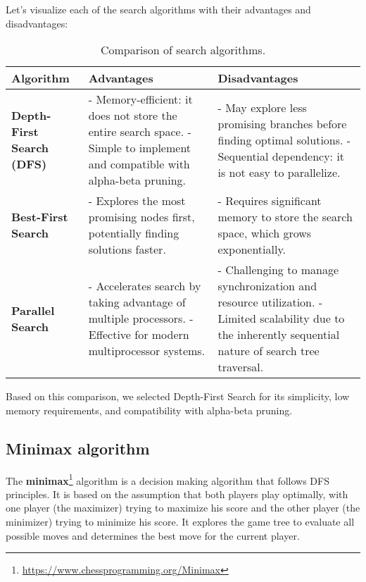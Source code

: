 \vspace{1em}

Let's visualize each of the search algorithms with their advantages and disadvantages:

\begin{table}[H]
\centering
\begin{tabular}{|p{3.5cm}|p{4.5cm}|p{4.5cm}|}
\hline
\textbf{Algorithm} & \textbf{Advantages} & \textbf{Disadvantages} \\ \hline
\textbf{Depth-First Search (DFS)} 
& 
- Memory-efficient: it does not store the entire search space. \newline 
- Simple to implement and compatible with alpha-beta pruning. 
& 
- May explore less promising branches before finding optimal solutions.
\newline
- Sequential dependency: it is not easy to parallelize. \\ \hline

\textbf{Best-First Search} 
& 
- Explores the most promising nodes first, potentially finding solutions faster. 
& 
- Requires significant memory to store the search space, which grows exponentially. \newline \\ \hline

\textbf{Parallel Search} 
& 
- Accelerates search by taking advantage of multiple processors. \newline 
- Effective for modern multiprocessor systems. 
& 
- Challenging to manage synchronization and resource utilization. \newline 
- Limited scalability due to the inherently sequential nature of search tree traversal. \\ \hline
\end{tabular}
\caption{Comparison of search algorithms.}
\label{tab:search-algorithms}
\end{table}

Based on this comparison, we selected Depth-First Search for its simplicity, low memory requirements, and compatibility with alpha-beta pruning.

\subsection{Minimax algorithm}

The \textbf{minimax}\footnote{\url{https://www.chessprogramming.org/Minimax}} algorithm is a decision making algorithm that follows DFS principles. It is based on the assumption that both players play optimally, with one player (the maximizer) trying to maximize his score and the other player (the minimizer) trying to minimize his score. It explores the game tree to evaluate all possible moves and determines the best move for the current player.

